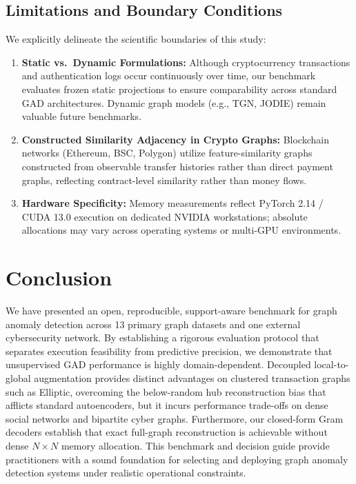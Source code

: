 \documentclass[11pt,a4paper]{article}
\begin{document}
\subsection{Limitations and Boundary Conditions}
We explicitly delineate the scientific boundaries of this study:
\begin{enumerate}
    \item \textbf{Static vs.\ Dynamic Formulations:} Although cryptocurrency transactions and authentication logs occur continuously over time, our benchmark evaluates frozen static projections to ensure comparability across standard GAD architectures. Dynamic graph models (e.g., TGN, JODIE) remain valuable future benchmarks.
    \item \textbf{Constructed Similarity Adjacency in Crypto Graphs:} Blockchain networks (Ethereum, BSC, Polygon) utilize feature-similarity graphs constructed from observable transfer histories rather than direct payment graphs, reflecting contract-level similarity rather than money flows.
    \item \textbf{Hardware Specificity:} Memory measurements reflect PyTorch 2.14 / CUDA 13.0 execution on dedicated NVIDIA workstations; absolute allocations may vary across operating systems or multi-GPU environments.
\end{enumerate}

\section{Conclusion}
\label{sec:conclusion}
We have presented an open, reproducible, support-aware benchmark for graph anomaly detection across 13 primary graph datasets and one external cybersecurity network. By establishing a rigorous evaluation protocol that separates execution feasibility from predictive precision, we demonstrate that unsupervised GAD performance is highly domain-dependent. Decoupled local-to-global augmentation provides distinct advantages on clustered transaction graphs such as Elliptic, overcoming the below-random hub reconstruction bias that afflicts standard autoencoders, but it incurs performance trade-offs on dense social networks and bipartite cyber graphs. Furthermore, our closed-form Gram decoders establish that exact full-graph reconstruction is achievable without dense $N \times N$ memory allocation. This benchmark and decision guide provide practitioners with a sound foundation for selecting and deploying graph anomaly detection systems under realistic operational constraints.
\end{document}
